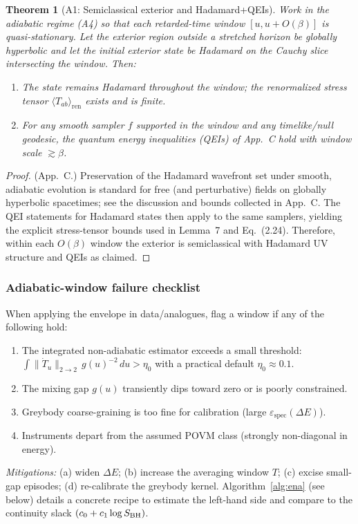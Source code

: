 \documentclass[aps,prd,preprint,onecolumn,superscriptaddress,nofootinbib,longbibliography,floatfix,11pt,showpacs,showkeys]{revtex4-2}
\theoremstyle{plain}
\newtheorem{theorem}{Theorem}
\theoremstyle{definition}
\theoremstyle{remark}
\begin{document}
\begin{theorem}[A1: Semiclassical exterior and Hadamard+QEIs]\label{thm:A1}
Work in the adiabatic regime (A4) so that each retarded-time window $[u,u+O(\beta)]$ is quasi-stationary. Let the exterior region outside a stretched horizon be globally hyperbolic and let the initial exterior state be Hadamard on the Cauchy slice intersecting the window. Then:
\begin{enumerate}
  \item The state remains Hadamard throughout the window; the renormalized stress tensor $\langle T_{ab}\rangle_{\mathrm{ren}}$ exists and is finite.
  \item For any smooth sampler $f$ supported in the window and any timelike/null geodesic, the quantum energy inequalities (QEIs) of App.~C hold with window scale $\gtrsim \beta$.
\end{enumerate}
\end{theorem}

\begin{proof}
(App.~C.) Preservation of the Hadamard wavefront set under smooth, adiabatic evolution is standard for free (and perturbative) fields on globally hyperbolic spacetimes; see the discussion and bounds collected in App.~C. The QEI statements for Hadamard states then apply to the same samplers, yielding the explicit stress-tensor bounds used in Lemma~7 and Eq.~(2.24). Therefore, within each $O(\beta)$ window the exterior is semiclassical with Hadamard UV structure and QEIs as claimed. 
\end{proof}

\subsubsection{Adiabatic-window failure checklist}
When applying the envelope in data/analogues, flag a window if any of the following hold:
\begin{enumerate}
  \item The integrated non-adiabatic estimator exceeds a small threshold:
        \(\displaystyle \int \|\dot T_u\|_{2\to 2}\, g(u)^{-2}\,du > \eta_0\)
        with a practical default \(\eta_0\approx 0.1\).
  \item The mixing gap \(g(u)\) transiently dips toward zero or is poorly constrained.
  \item Greybody coarse-graining is too fine for calibration (large \(\varepsilon_{\mathrm{spec}}(\Delta E)\)).
  \item Instruments depart from the assumed POVM class (strongly non-diago\-nal in energy).
\end{enumerate}
\emph{Mitigations:} (a) widen \(\Delta E\); (b) increase the averaging window \(T\);
(c) excise small-gap episodes; (d) re-calibrate the greybody kernel.
Algorithm~\ref{alg:ena} (see below) details a concrete recipe to
estimate the left-hand side and compare to the continuity slack \((c_0+c_1\log S_{\rm BH})\).
\end{document}
